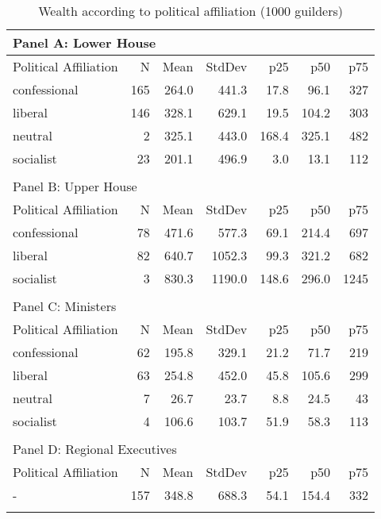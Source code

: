 \begin{table}[ht]
\centering
\begin{tabular}{lrrrrrr}
   
\multicolumn{7}{l}{Panel A: Lower House}\\ 
\hline
Political Affiliation & N & Mean & StdDev & p25 & p50 & p75 \\\hline

confessional & 165 & 264.0 & 441.3 & 17.8 & 96.1 & 327 \\ 
  liberal & 146 & 328.1 & 629.1 & 19.5 & 104.2 & 303 \\ 
  neutral &  2 & 325.1 & 443.0 & 168.4 & 325.1 & 482 \\ 
  socialist & 23 & 201.1 & 496.9 & 3.0 & 13.1 & 112 \\ 
   \hline\\ 
\multicolumn{7}{l}{Panel B: Upper House}\\ 
\hline
Political Affiliation & N & Mean & StdDev & p25 & p50 & p75 \\\hline
confessional & 78 & 471.6 & 577.3 & 69.1 & 214.4 & 697 \\ 
  liberal & 82 & 640.7 & 1052.3 & 99.3 & 321.2 & 682 \\ 
  socialist &  3 & 830.3 & 1190.0 & 148.6 & 296.0 & 1245 \\ 
   \hline\\ 
\multicolumn{7}{l}{Panel C: Ministers}\\ 
\hline
Political Affiliation & N & Mean & StdDev & p25 & p50 & p75 \\\hline
confessional & 62 & 195.8 & 329.1 & 21.2 & 71.7 & 219 \\ 
  liberal & 63 & 254.8 & 452.0 & 45.8 & 105.6 & 299 \\ 
  neutral &  7 & 26.7 & 23.7 & 8.8 & 24.5 & 43 \\ 
  socialist &  4 & 106.6 & 103.7 & 51.9 & 58.3 & 113 \\ 
   \hline\\ 
\multicolumn{7}{l}{Panel D: Regional Executives}\\ 
\hline
Political Affiliation & N & Mean & StdDev & p25 & p50 & p75 \\\hline
- & 157 & 348.8 & 688.3 & 54.1 & 154.4 & 332 \\ 
   \hline
\multicolumn{7}{l}{}\\
\end{tabular}
\caption{Wealth according to political affiliation (1000 guilders)} 
\label{tab:wealthfunction}
\end{table}
